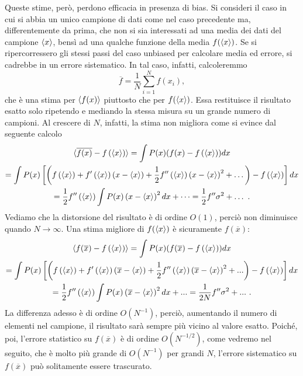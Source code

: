 \documentclass[LaM]{sapthesis}
\begin{document}
	 Queste stime, però, perdono efficacia in presenza di bias. Si consideri il caso in cui si abbia un unico campione di dati come nel caso precedente ma, differentemente da prima, che non si sia interessati ad una media dei dati del campione $\braket{x}$, bensì ad una qualche funzione della media $f(\braket{x})$. Se si ripercorressero gli stessi passi del caso unbiased per calcolare media ed errore, si cadrebbe in un errore sistematico. In tal caso, infatti, calcoleremmo
	 \begin{equation}
	 	\overline{f}=\frac{1}{N}\sum_{i=1}^{N}f(x_i),
	 \end{equation}
	 che è una stima per $\braket{f(x)}$ piuttosto che per $f(\braket{x})$. Essa restituisce il risultato esatto solo ripetendo  e mediando la stessa misura su un grande numero di campioni. Al crescere di $N$, infatti, la stima non migliora come si evince dal seguente calcolo
	 \begin{multline}
	\braket{\overline{f(x)}-f\left(\braket{x}\right)}=
	\int P(x)(f(x)-f\left(\braket{x}\right))dx \\
	=\int P(x)\left[\left(f\left(\braket{x}\right)+f'\left(\braket{x}\right)\left(x-\braket{x}\right)+\frac{1}{2}f''\left(\braket{x}\right)\left(x-\braket{x}\right)^2+\dots\right)-f\left(\braket{x}\right)\right] dx\\
	=\frac{1}{2}f''\left(\braket{x}\right) \int P(x) \left(x-\braket{x}\right)^2 dx +\dots = \frac{1}{2}f''\sigma^2+\dots \ .
	 \end{multline}
	 Vediamo che la distorsione del risultato è di ordine $O(1)$, perciò non diminuisce quando $N\to\infty$. Una stima migliore di $f(\braket{x})$ è sicuramente $f(\overline{x})$:
	 \begin{multline}
	 \braket{f(\overline{x})-f\left(\braket{x}\right)}=\int P(x)(f(\overline{x})-f\left(\braket{x}\right))dx\\ = \int P(x)\left[\left(f\left(\braket{x}\right)+f'\left(\braket{x}\right)\left(\overline{x}-\braket{x}\right)+\frac{1}{2}f''\left(\braket{x}\right)\left(\overline{x}-\braket{x}\right)^2+...\right)-f\left(\braket{x}\right)\right] dx\\ =\frac{1}{2}f''\left(\braket{x}\right) \int P(x) \left(\overline{x}-\braket{x}\right)^2 dx +... = \frac{1}{2N}f''\sigma^2+... \ .
	 \end{multline}
	 La differenza adesso è di ordine $O(N^{-1})$, perciò, aumentando il numero di elementi nel campione, il risultato sarà sempre più vicino al valore esatto. Poiché, poi, l'errore statistico su $f(\overline{x})$ è di ordine $O(N^{-1/2})$, come vedremo nel seguito, che è molto più grande di $O(N^{-1})$ per grandi $N$, l'errore sistematico su $f(\overline{x})$ può solitamente essere trascurato.
	 
\end{document}
